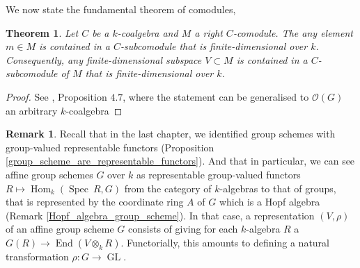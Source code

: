 \documentclass{article}
\theoremstyle{plain}
\newtheorem{theorem}{Theorem}[subsection]
\theoremstyle{definition}
\newtheorem{remark}{Remark}
\DeclareMathOperator{\Hom}{Hom}
\DeclareMathOperator{\GL}{GL}
\DeclareMathOperator{\Spec}{Spec}
\DeclareMathOperator{\End}{End}
\begin{document}
\noindent We now state the fundamental theorem of comodules, 

\begin{theorem}
\label{fundamental_theorem_comodule}
    Let $C$ be a $k$-coalgebra and $M$ a right $C$-comodule.
    The any element $m\in M$ is contained in a $C$-subcomodule that is finite-dimensional over $k$. Consequently, any finite-dimensional subspace $V\subset M$ is contained in a $C$-subcomodule of $M$ that is finite-dimensional over $k$.
\end{theorem}
\begin{proof}
    See \cite{Milne_alg_group}, Proposition $4.7$, where the statement can be generalised to $\mathcal{O}(G)$ an arbitrary $k$-coalgebra
\end{proof}


\begin{remark}
\label{representation_of_group_as_functor}
    Recall that in the last chapter, we identified group schemes with group-valued representable functors (Proposition \ref{group_scheme_are_representable_functors}).
    And that in particular, we can see affine group schemes $G$ over $k$ as representable group-valued functors $R\mapsto \Hom_k(\Spec\:R,G)$ from the category of $k$-algebras to that of groups, that is represented by the coordinate ring $A$ of $G$ which is a Hopf algebra (Remark \ref{Hopf_algebra_group_scheme}).
    In that case, a representation $(V,\rho)$ of an affine group scheme $G$ consists of giving for each $k$-algebra $R$ a $G(R)\rightarrow \End(V\otimes_kR)$. Functorially, this amounts to defining a natural transformation $\rho:G\rightarrow \GL$.
\end{remark}
\end{document}
